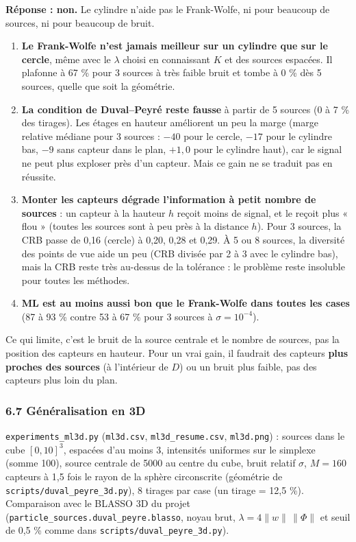 \documentclass[
  french,
]{article}
\providecommand{\tightlist}{%
  \setlength{\itemsep}{0pt}\setlength{\parskip}{0pt}}
\begin{document}
\textbf{Réponse : non.} Le cylindre n'aide pas le Frank-Wolfe, ni pour
beaucoup de sources, ni pour beaucoup de bruit.

\begin{enumerate}
\def\labelenumi{\arabic{enumi}.}
\tightlist
\item
  \textbf{Le Frank-Wolfe n'est jamais meilleur sur un cylindre que sur
  le cercle}, même avec le \(\lambda\) choisi en connaissant \(K\) et
  des sources espacées. Il plafonne à 67 \% pour 3 sources à très faible
  bruit et tombe à 0 \% dès 5 sources, quelle que soit la géométrie.
\item
  \textbf{La condition de Duval--Peyré reste fausse} à partir de 5
  sources (0 à 7 \% des tirages). Les étages en hauteur améliorent un
  peu la marge (marge relative médiane pour 3 sources : \(-40\) pour le
  cercle, \(-17\) pour le cylindre bas, \(-9\) sans capteur dans le
  plan, \(+1{,}0\) pour le cylindre haut), car le signal ne peut plus
  exploser près d'un capteur. Mais ce gain ne se traduit pas en
  réussite.
\item
  \textbf{Monter les capteurs dégrade l'information à petit nombre de
  sources} : un capteur à la hauteur \(h\) reçoit moins de signal, et le
  reçoit plus « flou » (toutes les sources sont à peu près à la distance
  \(h\)). Pour 3 sources, la CRB passe de 0,16 (cercle) à 0,20, 0,28 et
  0,29. À 5 ou 8 sources, la diversité des points de vue aide un peu
  (CRB divisée par 2 à 3 avec le cylindre bas), mais la CRB reste très
  au-dessus de la tolérance : le problème reste insoluble pour toutes
  les méthodes.
\item
  \textbf{ML est au moins aussi bon que le Frank-Wolfe dans toutes les
  cases} (87 à 93 \% contre 53 à 67 \% pour 3 sources à
  \(\sigma = 10^{-4}\)).
\end{enumerate}

Ce qui limite, c'est le bruit de la source centrale et le nombre de
sources, pas la position des capteurs en hauteur. Pour un vrai gain, il
faudrait des capteurs \textbf{plus proches des sources} (à l'intérieur
de \(D\)) ou un bruit plus faible, pas des capteurs plus loin du plan.

\subsubsection{6.7 Généralisation en
3D}\label{guxe9nuxe9ralisation-en-3d}

\texttt{experiments\_ml3d.py} (\texttt{ml3d.csv},
\texttt{ml3d\_resume.csv}, \texttt{ml3d.png}) : sources dans le cube
\([0,10]^3\), espacées d'au moins 3, intensités uniformes sur le
simplexe (somme 100), source centrale de 5000 au centre du cube, bruit
relatif \(\sigma\), \(M = 160\) capteurs à 1,5 fois le rayon de la
sphère circonscrite (géométrie de \texttt{scripts/duval\_peyre\_3d.py}),
8 tirages par case (un tirage = 12,5 \%). Comparaison avec le BLASSO 3D
du projet (\texttt{particle\_sources.duval\_peyre.blasso}, noyau brut,
\(\lambda = 4\lVert
w\rVert\,\lVert\Phi\rVert\) et seuil de 0,5 \% comme dans
\texttt{scripts/duval\_peyre\_3d.py}).
\end{document}
